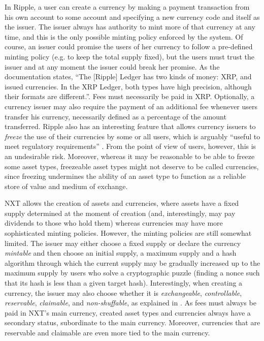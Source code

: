 \documentclass{llncs}
\begin{document}
In Ripple, a user can create a currency by making a payment transaction from his own account to some account and specifying a new currency code and itself as the issuer. The issuer always has authority to mint more of that currency at any time, and this is the only possible minting policy enforced by the system. Of course, an issuer could promise the users of her currency to follow a pre-defined minting policy (e.g. to keep the total supply fixed), but the users must trust the issuer and at any moment the issuer could break her promise. As the documentation \cite{RippleCurrencyFormat} states, ``The [Ripple] Ledger has two kinds of money: XRP, and issued currencies. In the XRP Ledger, both types have high precision, although their formats are different.''. Fees must necessarily be paid in XRP. Optionally, a currency issuer may also require the payment of an additional fee whenever users transfer his currency, necessarily defined as a percentage of the amount transferred. Ripple also has an interesting feature that allows currency issuers to \emph{freeze} the use of their currencies by some or all users, which is arguably ``useful to meet regulatory requirements'' \cite{RippleFreeze}. From the point of view of users, however, this is an undesirable risk. Moreover, whereas it may be reasonable to be able to freeze some asset types, freezeable asset types might not deserve to be called currencies, since freezing undermines the ability of an asset type to function as a reliable store of value and medium of exchange.

NXT allows the creation of assets and currencies, where assets have a fixed supply determined at the moment of creation (and, interestingly, may pay dividends to those who hold them) whereas currencies may have more sophisticated minting policies. However, the minting policies are still somewhat limited. The issuer may either choose a fixed supply or declare the currency \emph{mintable} and then choose an initial supply, a maximum supply and a hash algorithm through which the current supply may be gradually increased up to the maximum supply by users who solve a cryptographic puzzle (finding a nonce such that its hash is less than a given target hash). Interestingly, when creating a currency, the issuer may also choose whether it is \emph{exchangeable}, \emph{controllable}, \emph{reservable}, \emph{claimable}, and \emph{non-shuffable}, as explained in \cite{NXTCurrencyProperties}. As fees must always be paid in NXT's main currency, created asset types and currencies always have a secondary status, subordinate to the main currency. Moreover, currencies that are reservable and claimable are even more tied to the main currency.
\end{document}
